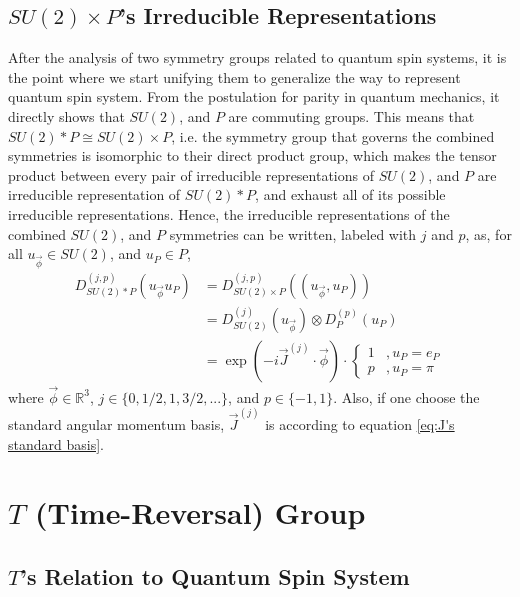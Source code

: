 \documentclass[preprint, 12pt]{revtex4-2}
\numberwithin{equation}{section}
\begin{document}
\subsection{$SU(2)\times P$'s Irreducible Representations}
After the analysis of two symmetry groups related to quantum spin systems, it is the point where we start unifying them to generalize the way to represent quantum spin system. From the postulation for parity in quantum mechanics, it directly shows that $SU(2)$, and $P$ are commuting groups. This means that $SU(2)\ast P\cong SU(2)\times P$, i.e. the symmetry group that governs the combined symmetries is isomorphic to their direct product group, which makes the tensor product between every pair of irreducible representations of $SU(2)$, and $P$ are irreducible representation of $SU(2)\ast P$, and exhaust all of its possible irreducible representations. Hence, the irreducible representations of the combined $SU(2)$, and $P$ symmetries can be written, labeled with $j$ and $p$, as, for all $u_{\vec{\phi}}\in SU(2)$, and $u_P \in P$,
\begin{equation}\label{eq:SU2*P Irreps}
    \begin{aligned}
        D^{(j,p)}_{SU(2)\ast P}(u_{\vec{\phi}} u_P) &= D^{(j,p)}_{SU(2)\times P}((u_{\vec{\phi}},u_P)) \\
        &= D^{(j)}_{SU(2)}(u_{\vec{\phi}})\otimes D^{(p)}_{P}(u_P) \\
        &= \exp(-i\vec{J}^{(j)}\cdot\vec{\phi})\cdot \begin{cases}
                                                        1 &, u_P = e_P \\
                                                        p &, u_P = \pi
                                                    \end{cases}
    \end{aligned}
\end{equation}
where $\vec{\phi}\in\mathbb{R}^3$, $j\in\{0, 1/2, 1, 3/2, ...\}$, and $p\in\{-1, 1\}$. Also, if one choose the standard angular momentum basis, $\vec{J}^{(j)}$ is according to equation \ref{eq:J's standard basis}.

\newpage
\section{$T$ (Time-Reversal) Group}

\subsection{$T$'s Relation to Quantum Spin System}
\end{document}
